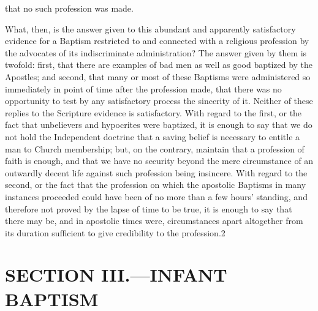 \documentclass[]{book}
\begin{document}
that no such profession was made.

What, then, is the answer given to this abundant and apparently satisfactory evidence for a Baptism restricted to and connected with a religious profession by the advocates of its indiscriminate administration? The answer given by them is twofold: first, that there are examples of bad men as well as good baptized by the Apostles; and second, that many or most of these Baptisms were administered so immediately in point of time after the profession made, that there was no opportunity to test by any satisfactory process the sincerity of it. Neither of these replies to the Scripture evidence is satisfactory. With regard to the first, or the fact that unbelievers and hypocrites were baptized, it is enough to say that we do not hold the Independent doctrine that a saving belief is necessary to entitle a man to Church membership; but, on the contrary, maintain that a profession of faith is enough, and that we have no security beyond the mere circumstance of an outwardly decent life against such profession being insincere. With regard to the second, or the fact that the profession on which the apostolic Baptisms in many instances proceeded could have been of no more than a few hours' standing, and therefore not proved by the lapse of time to be true, it is enough to say that there may be, and in apostolic times were, circumstances apart altogether from its duration sufficient to give credibility to the profession.2

\hypertarget{section-iii.infant-baptism}{%
\section{SECTION III.---INFANT BAPTISM}\label{section-iii.infant-baptism}}
\end{document}
